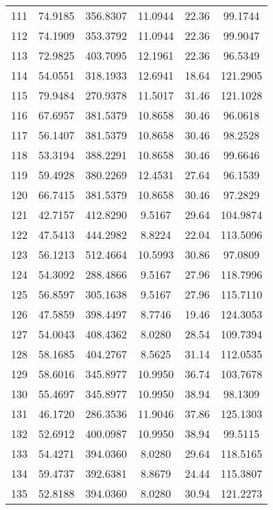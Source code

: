\begin{center}
\begin{footnotesize}
\begin{tabular}{|c|ccccc|}
111 & 74.9185 & 356.8307 & 11.0944 & 22.36 & 99.1744 \\
112 & 74.1909 & 353.3792 & 11.0944 & 22.36 & 99.9047 \\
113 & 72.9825 & 403.7095 & 12.1961 & 22.36 & 96.5349 \\
114 & 54.0551 & 318.1933 & 12.6941 & 18.64 & 121.2905 \\
115 & 79.9484 & 270.9378 & 11.5017 & 31.46 & 121.1028 \\
116 & 67.6957 & 381.5379 & 10.8658 & 30.46 & 96.0618 \\
117 & 56.1407 & 381.5379 & 10.8658 & 30.46 & 98.2528 \\
118 & 53.3194 & 388.2291 & 10.8658 & 30.46 & 99.6646 \\
119 & 59.4928 & 380.2269 & 12.4531 & 27.64 & 96.1539 \\
120 & 66.7415 & 381.5379 & 10.8658 & 30.46 & 97.2829 \\
121 & 42.7157 & 412.8290 & 9.5167 & 29.64 & 104.9874 \\
122 & 47.5413 & 444.2982 & 8.8224 & 22.04 & 113.5096 \\
123 & 56.1213 & 512.4664 & 10.5993 & 30.86 & 97.0809 \\
124 & 54.3092 & 288.4866 & 9.5167 & 27.96 & 118.7996 \\
125 & 56.8597 & 305.1638 & 9.5167 & 27.96 & 115.7110 \\
126 & 47.5859 & 398.4497 & 8.7746 & 19.46 & 124.3053 \\
127 & 54.0043 & 408.4362 & 8.0280 & 28.54 & 109.7394 \\
128 & 58.1685 & 404.2767 & 8.5625 & 31.14 & 112.0535 \\
129 & 58.6016 & 345.8977 & 10.9950 & 36.74 & 103.7678 \\
130 & 55.4697 & 345.8977 & 10.9950 & 38.94 & 98.1309 \\
131 & 46.1720 & 286.3536 & 11.9046 & 37.86 & 125.1303 \\
132 & 52.6912 & 400.0987 & 10.9950 & 38.94 & 99.5115 \\
133 & 54.4271 & 394.0360 & 8.0280 & 29.64 & 118.5165 \\
134 & 59.4737 & 392.6381 & 8.8679 & 24.44 & 115.3807 \\
135 & 52.8188 & 394.0360 & 8.0280 & 30.94 & 121.2273 \\
\hline
\end{tabular}
\end{footnotesize}
\end{center}

